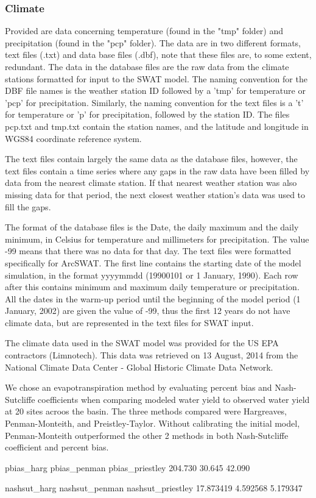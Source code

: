 \subsubsection{Climate}	

Provided are data concerning temperature (found in the "tmp" folder) and precipitation	(found in the "pcp" folder). The data are in two different formats, text files (.txt) and data base files (.dbf),	note that these files are, to some extent, redundant. The data in the database files are the raw data from the climate stations formatted for input to the SWAT model. The naming convention for the DBF file names is the weather station ID followed by a 'tmp' for temperature or 'pcp' for precipitation.	Similarly, the naming convention for the text files is a 't' for temperature or 'p' for precipitation, followed by the station ID. The files pcp.txt and tmp.txt contain the station names, and the latitude and longitude in WGS84 coordinate reference system.

The text files contain largely the same data as the database files, however, the text files contain a time series where any gaps in the raw data have been filled by data from the nearest climate station. If that nearest weather station was also missing data for that period, the next closest weather station's data was used to fill the gaps. 

The format of the database files is the Date, the daily maximum and the daily minimum, in Celsius for temperature and millimeters for precipitation. The value -99 means that there was no data for that day. The text files were formatted specifically for ArcSWAT. The first line contains the starting date of the model simulation, in the format yyyymmdd (19900101 or 1 January, 1990). Each row after this contains minimum and maximum daily temperature or precipitation. All the dates in the warm-up period until the beginning of the model period (1 January, 2002) are given the value of -99, thus the first 12 years do not have climate data, but are represented in the text files for SWAT input. 

The climate data used in the SWAT model was provided for the US EPA contractors (Limnotech). This data was retrieved on 13 August, 2014 from the National Climate Data Center - Global Historic Climate Data Network.

We chose an evapotranspiration method by evaluating percent bias and Nash-Sutcliffe coefficients when comparing modeled water yield to observed water yield at 20 sites acroos the basin. The three methods compared were Hargreaves, Penman-Monteith, and Preistley-Taylor. Without calibrating the initial model, Penman-Monteith outperformed the other 2 methods in both Nash-Sutcliffe coefficient and percent bias. 

     pbias_harg    pbias_penman pbias_priestley 
        204.730          30.645          42.090 

     nashsut_harg    nashsut_penman nashsut_priestley 
        17.873419          4.592568          5.179347 
